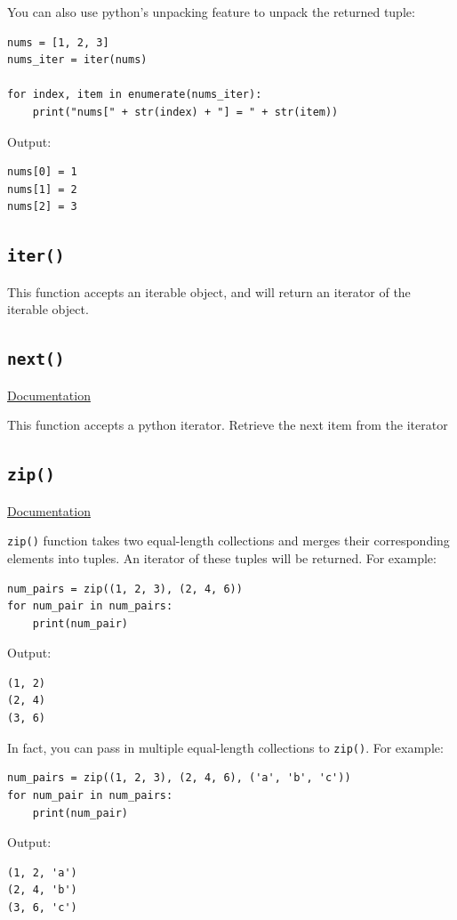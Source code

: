 \documentclass[12pt]{book}
\begin{document}
You can also use python's unpacking feature to unpack the returned tuple:
\begin{verbatim}
nums = [1, 2, 3]
nums_iter = iter(nums)

for index, item in enumerate(nums_iter):
    print("nums[" + str(index) + "] = " + str(item))
\end{verbatim}
Output:
\begin{verbatim}
nums[0] = 1
nums[1] = 2
nums[2] = 3
\end{verbatim}

\subsection{\texttt{iter()}}
\label{sec:org0d6096b}
This function accepts an iterable object, and will return an iterator of the iterable object.
\subsection{\texttt{next()}}
\label{sec:orgd23b95a}
\href{https://docs.python.org/3/library/functions.html\#next}{Documentation}

This function accepts a python iterator. Retrieve the next item from the iterator
\subsection{\texttt{zip()}}
\label{sec:org680a75b}
\href{https://docs.python.org/3/library/functions.html\#zip}{Documentation}

\texttt{zip()} function takes two equal-length collections and merges their corresponding elements into tuples. An iterator of these tuples will be returned. For example:
\begin{verbatim}
num_pairs = zip((1, 2, 3), (2, 4, 6))
for num_pair in num_pairs:
    print(num_pair)
\end{verbatim}
Output:
\begin{verbatim}
(1, 2)
(2, 4)
(3, 6)
\end{verbatim}
In fact, you can pass in multiple equal-length collections to \texttt{zip()}. For example:
\begin{verbatim}
num_pairs = zip((1, 2, 3), (2, 4, 6), ('a', 'b', 'c'))
for num_pair in num_pairs:
    print(num_pair)
\end{verbatim}
Output:
\begin{verbatim}
(1, 2, 'a')
(2, 4, 'b')
(3, 6, 'c')
\end{verbatim}
\end{document}
